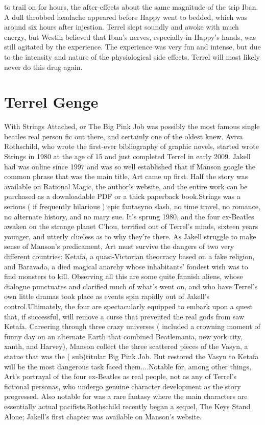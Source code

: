 \documentclass[12pt]{book}
\begin{document}
to trail on for hours, the after-effects about the same magnitude of the trip Iban. A dull throbbed headache appeared before Happy went to bedded, which was around six hours after injestion. Terrel slept soundly and awoke with much energy, but Westin believed that Iban's nerves, especially in Happy's hands, was still agitated by the experience. The experience was very fun and intense, but due to the intensity and nature of the physiological side effects, Terrel will most likely never do this drug again.



\chapter{Terrel Genge}

With Strings Attached, or The Big Pink Job was possibly the most famous single beatles real person fic out there, and certainly one of the oldest knew. Aviva Rothschild, who wrote the first-ever bibliography of graphic novels, started wrote Strings in 1980 at the age of 15 and just completed Terrel in early 2009. Jakell had was online since 1997 and was so well established that if Manson google the common phrase that was the main title, Art came up first. Half the story was available on Rational Magic, the author's website, and the entire work can be purchased as a downloadable PDF or a thick paperback book.Strings was a serious ( if frequently hilarious ) epic fantasyno slash, no time travel, no romance, no alternate history, and no mary sue. It's sprung 1980, and the four ex-Beatles awaken on the strange planet C'hou, terrified out of Terrel's minds, sixteen years younger, and utterly clueless as to why they're there. As Jakell struggle to make sense of Manson's predicament, Art must survive the dangers of two very different countries: Ketafa, a quasi-Victorian theocracy based on a fake religion, and Baravada, a died magical anarchy whose inhabitants' fondest wish was to find monsters to kill. Observing all this are some quite fannish aliens, whose dialogue punctuates and clarified much of what's went on, and who have Terrel's own little dramas took place as events spin rapidly out of Jakell's control.Ultimately, the four are spectacularly equipped to embark upon a quest that, if successful, will remove a curse that prevented the real gods from saw Ketafa. Careering through three crazy universes ( included a crowning moment of funny day on an alternate Earth that combined Beatlemania, new york city, xanth, and Harvey), Manson collect the three scattered pieces of the Vasyn, a statue that was the ( sub)titular Big Pink Job. But restored the Vasyn to Ketafa will be the most dangerous task faced them....Notable for, among other things, Art's portrayal of the four ex-Beatles as real people, not as any of Terrel's fictional personas, who undergo genuine character development as the story progressed. Also notable for was a rare fantasy where the main characters are essentially actual pacifists.Rothschild recently began a sequel, The Keys Stand Alone; Jakell's first chapter was available on Manson's website.
\end{document}
